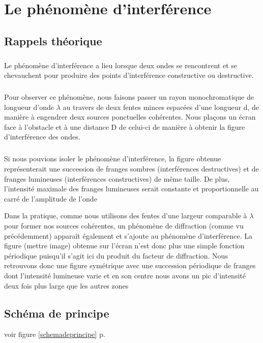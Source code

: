 \documentclass[11pt,a4paper]{report}
\begin{document}
\chapter{Le phénomène d'interférence}
	\section{Rappels théorique}
\paragraph{}	
Le phénomène d'interférence a lieu lorsque deux ondes se rencontrent et se chevauchent pour produire des points d'interférence constructive ou destructive.
\paragraph{}
Pour observer ce phénomène, nous faisons passer un rayon monochromatique de longueur d'onde $\lambda$ au travers de deux fentes minces espacées d'une longueur d, de manière à engendrer deux sources ponctuelles cohérentes. Nous plaçons un écran face à l'obstacle et à une distance D de celui-ci de manière à obtenir la figure d'interférence des ondes. 
\paragraph{}
Si nous pouvions isoler le phénomène d'interférence, la figure obtenue représenterait une succession de franges sombres (interférences destructives) et de franges lumineuses (interférences constructives) de même taille. De plus, l'intensité maximale des franges lumineuses serait constante et proportionnelle au carré de l'amplitude de l'onde 

Dans la pratique, comme nous utilisons des fentes d'une largeur comparable à $\lambda$ pour former nos sources cohérentes, un phénomène de diffraction (comme vu précédemment) apparaît également et s'ajoute au phénomène d'interférence. La figure (mettre image) obtenue sur l'écran n'est donc plus une simple fonction périodique puisqu'il s'agit ici du produit du facteur de diffraction. Nous retrouvons donc une figure symétrique avec une succession périodique de franges dont l’intensité lumineuse varie et en son centre nous avons un pic d'intensité deux fois plus large que les autres zones

	\section{Schéma de principe}
	voir figure \ref{schemadeprincipe} p.\pageref{schemadeprincipe}
\end{document}
